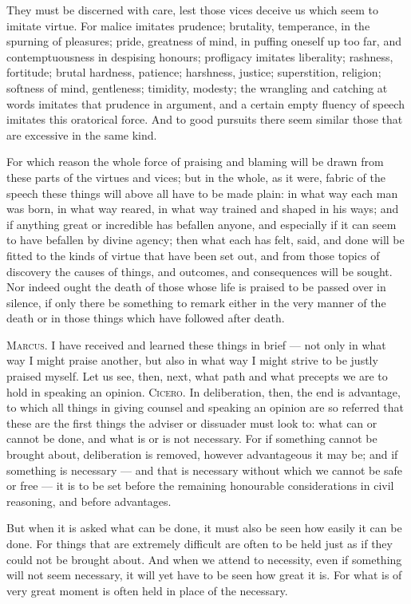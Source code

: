  They must be discerned with care, lest those vices deceive us which seem to imitate virtue. For malice imitates prudence; brutality, temperance, in the spurning of pleasures; pride, greatness of mind, in puffing oneself up too far, and contemptuousness in despising honours; profligacy imitates liberality; rashness, fortitude; brutal hardness, patience; harshness, justice; superstition, religion; softness of mind, gentleness; timidity, modesty; the wrangling and catching at words imitates that prudence in argument, and a certain empty fluency of speech imitates this oratorical force. And to good pursuits there seem similar those that are excessive in the same kind.

 For which reason the whole force of praising and blaming will be drawn from these parts of the virtues and vices; but in the whole, as it were, fabric of the speech these things will above all have to be made plain: in what way each man was born, in what way reared, in what way trained and shaped in his ways; and if anything great or incredible has befallen anyone, and especially if it can seem to have befallen by divine agency; then what each has felt, said, and done will be fitted to the kinds of virtue that have been set out, and from those topics of discovery the causes of things, and outcomes, and consequences will be sought. Nor indeed ought the death of those whose life is praised to be passed over in silence, if only there be something to remark either in the very manner of the death or in those things which have followed after death.

 \textsc{Marcus.} I have received and learned these things in brief — not only in what way I might praise another, but also in what way I might strive to be justly praised myself. Let us see, then, next, what path and what precepts we are to hold in speaking an opinion. \textsc{Cicero.} In deliberation, then, the end is advantage, to which all things in giving counsel and speaking an opinion are so referred that these are the first things the adviser or dissuader must look to: what can or cannot be done, and what is or is not necessary. For if something cannot be brought about, deliberation is removed, however advantageous it may be; and if something is necessary — and that is necessary without which we cannot be safe or free — it is to be set before the remaining honourable considerations in civil reasoning, and before advantages.

 But when it is asked what can be done, it must also be seen how easily it can be done. For things that are extremely difficult are often to be held just as if they could not be brought about. And when we attend to necessity, even if something will not seem necessary, it will yet have to be seen how great it is. For what is of very great moment is often held in place of the necessary.

